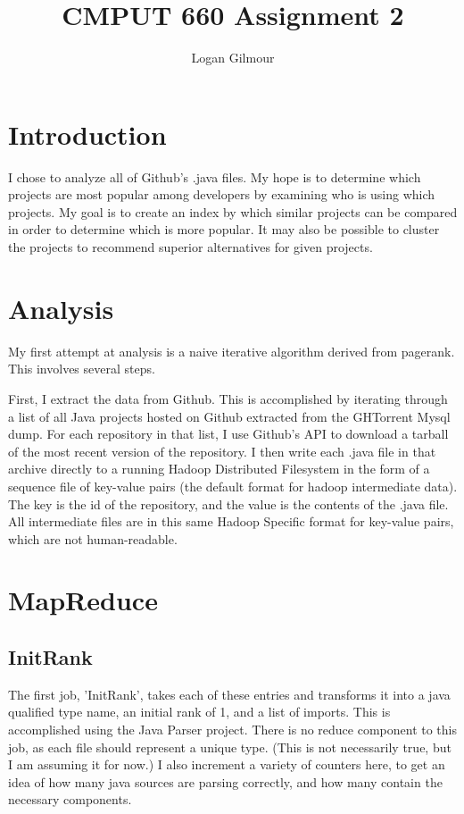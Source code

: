 \documentclass{article}
\begin{document}
\title{CMPUT 660 Assignment 2}
\author{Logan Gilmour}

\maketitle

\section{Introduction}

I chose to analyze all of Github's .java files. My hope is to determine which projects are most popular among developers by examining who is using which projects. My goal is to create an index by which similar projects can be compared in order to determine which is more popular. It may also be possible to cluster the projects to recommend superior alternatives for given projects.


\section{Analysis}

My first attempt at analysis is a naive iterative algorithm derived from pagerank. This involves several steps.

First, I extract the data from Github. This is accomplished by iterating through a list of all Java projects hosted on Github extracted from the GHTorrent Mysql dump. For each repository in that list, I use Github's API to download a tarball of the most recent version of the repository. I then write each .java file in that archive directly to a running Hadoop Distributed Filesystem in the form of a sequence file of key-value pairs (the default format for hadoop intermediate data). The key is the id of the repository, and the value is the contents of the .java file. All intermediate files are in this same Hadoop Specific format for key-value pairs, which are not human-readable.

\vspace{\baselineskip} 

\section{MapReduce}

\subsection{InitRank}
The first job, 'InitRank', takes each of these entries and transforms it into a java qualified type name, an initial rank of 1, and a list of imports. This is accomplished using the Java Parser project. There is no reduce component to this job, as each file should represent a unique type. (This is not necessarily true, but I am assuming it for now.) I also increment a variety of counters here, to get an idea of how many java sources are parsing correctly, and how many contain the necessary components.
\end{document}
